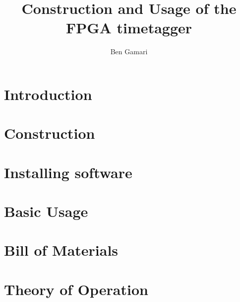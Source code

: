 \documentclass{report}
\begin{document}
\title{Construction and Usage of the FPGA timetagger}
\author{Ben Gamari}
\maketitle

\tableofcontents

\chapter{Introduction}


\chapter{Construction}
\label{Ch:Construction}


\chapter{Installing software}
\label{Ch:Installing}


\chapter{Basic Usage}
\label{Ch:BasicUsage}


%

\appendix
\chapter{Bill of Materials}
\label{Ch:BoM}


\chapter{Theory of Operation}
\label{Ch:Theory}

\end{document}
